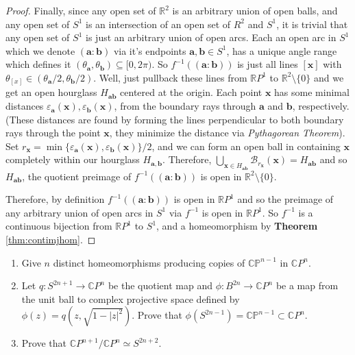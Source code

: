 \documentclass[addpoints,10pt]{exam}
\theoremstyle{plain}
\theoremstyle{definition}
\newtheorem{prob}[thm]{Problem}
\theoremstyle{plain}
\theoremstyle{plain}
\theoremstyle{definition}
\let\oldprob\prob
\let\endoldprob\endprob
\renewenvironment{prob}
  {\begin{singlespace}\oldprob}
  {\endoldprob\end{singlespace}}
\newcommand{\CC}{\ensuremath{\mathbb{C}}}
\newcommand{\RR}{\ensuremath{\mathbb{R}}}
\newcommand{\BB}{\ensuremath{\mathcal{B}}}
\newcommand{\mbf}[1]{\ensuremath{\mathbf{#1}}}
\begin{document}
\begin{proof}
    Finally, since any open set of $\RR^{2}$ is an arbitrary union of open balls, and any open set of $S^{1}$ is an intersection of an open set of $R^{2}$ and $S^{1}$, it is trivial that any open set of $S^{1}$ is just an arbitrary union of open arcs. Each an open arc in $S^{1}$ which we denote $(\mbf{a}:\mbf{b})$ via it's endpoints $\mbf{a},\mbf{b}\in S^{1}$, has a unique angle range which defines it $(\theta_{\mbf{a}},\theta_{\mbf{b}})\subseteq [0,2\pi)$. So $f^{-1}((\mbf{a}:\mbf{b}))$ is just all lines $[\mbf{x}]$ with $\theta_{[x]}\in (\theta_{\mbf{a}}/2,\theta_{\mbf{b}}/2)$. Well, just pullback these lines from $\RR P^{1}$ to $\RR^{2}\setminus\{0\}$ and we get an open hourglass $H_{\mbf{a}\mbf{b}}$ centered at the origin. Each point $\mbf{x}$ has some minimal distances $\varepsilon_{\mbf{a}}(\mbf{x}),\varepsilon_{\mbf{b}}(\mbf{x})$, from the boundary rays through $\mbf{a}$ and $\mbf{b}$, respectively. (These distances are found by forming the lines perpendicular to both boundary rays through the point $\mbf{x}$, they minimize the distance via \textit{Pythagorean Theorem}). Set $r_{\mbf{x}}=\min\{\varepsilon_{\mbf{a}}(\mbf{x}),\varepsilon_{\mbf{b}}(\mbf{x})\}/2$, and we can form an open ball in containing $\mbf{x}$ completely within our hourglass $H_{\mbf{a},\mbf{b}}$. Therefore, $\bigcup_{\mbf{x}\in H_{\mbf{a}\mbf{b}}}\BB_{r_{\mbf{x}}}(\mbf{x})=H_{\mbf{a}\mbf{b}}$ and so $H_{\mbf{a}\mbf{b}}$, the quotient preimage of $f^{-1}((\mbf{a}:\mbf{b}))$ is open in $\RR^{2}\setminus\{0\}$. 
    
    Therefore, by definition $f^{-1}((\mbf{a}:\mbf{b}))$ is open in $\RR P^{1}$ and so the preimage of any arbitrary union of open arcs in $S^{1}$ via $f^{-1}$ is open in $\RR P^{1}.$ So $f^{-1}$ is a continuous bijection from $\RR P^{1}$ to $S^{1}$, and a homeomorphism by \textbf{Theorem }\ref{thm:contimjhom}.

  \end{proof}
\newpage
\setcounter{thm}{1}
\begin{prob}
\begin{enumerate}[label=(\alph*)]
    \item Give $n$ distinct homeomorphisms producing copies of $\mathbb{CP}^{n-1}$ in $\CC P^{n}$.

    \item Let $q:S^{2n+1}\to\CC P^{n}$ be the quotient map and $\phi:B^{2n}\to\CC P^{n}$ be a map from the unit ball to complex projective space defined by $\phi(z)=q(z,\sqrt{1-|z|^{2}})$. Prove that $\phi(S^{2n-1})=\mathbb{CP}^{n-1}\subset\CC P^{n}$.

    \item Prove that $\CC P^{n+1}/\CC P^{n}\simeq S^{2n+2}$.
\end{enumerate}
\end{prob}
\end{document}
